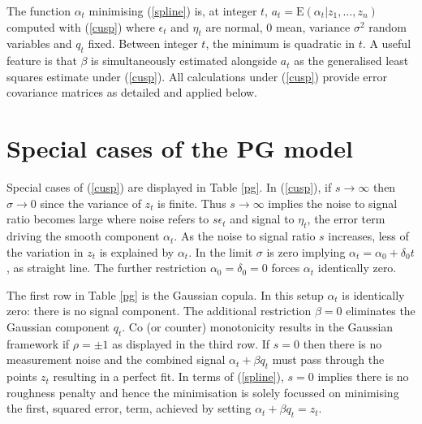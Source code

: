 \documentclass[authoryear]{elsarticle}
\newcommand{\E}{\mathrm{E}}
\newcommand{\eps}{\epsilon}
\newcommand{\eref}[1]{(\ref{#1})}
\newcommand{\tref}[1]{Table \ref{#1}}
\begin{document}
The  function $\alpha_t$ minimising \eref{spline}  is, at integer $t$,  $a_t=\E(\alpha_t|z_1,\ldots,z_n)$  computed with \eref{cusp} where $\eps_t$ and $\eta_t$ are normal, 0 mean, variance $\sigma^2$ random variables and $q_t$ fixed.  Between integer $t$,  the  minimum is quadratic in $t$.  A useful feature is that $\beta$ is simultaneously estimated alongside $a_t$ as the generalised least squares estimate under \eref{cusp}.  All calculations under \eref{cusp} provide error covariance matrices as detailed and applied below.  

\section{Special cases of the PG model}  

Special cases of  \eref{cusp}  are displayed in \tref{pg}.   In \eref{cusp}, if $s\rightarrow\infty$ then $\sigma\rightarrow 0$   since the variance of $z_t$ is finite.    Thus $s\rightarrow\infty$  implies the noise to signal ratio becomes large where noise refers to   $s\eps_t$ and signal to $\eta_t$, the error term driving  the smooth component $\alpha_t$.   As the noise to signal ratio $s$ increases, less of the variation in $z_t$ is explained by $\alpha_t$.  In the limit $\sigma$ is zero implying $\alpha_t=\alpha_0+\delta_0 t$, as straight line.   The further restriction $\alpha_0=\delta_0=0$ forces $\alpha_t$ identically zero.



The first row in \tref{pg} is the  Gaussian copula.  In this setup $\alpha_t$ is identically zero: there is no  signal component.  The additional restriction $\beta=0$ eliminates the Gaussian component $q_t$.  Co (or counter) monotonicity results in the Gaussian framework if $\rho=\pm 1$ as displayed in the third row.
If $s= 0$ then there is no measurement noise and the combined signal $\alpha_t+\beta q_t$ must pass through the points $z_t$ resulting in a perfect fit.   In terms of \eref{spline}, $s=0$ implies there is no roughness penalty and hence the minimisation is solely focussed on minimising the first, squared error, term, achieved  by setting $\alpha_t+\beta q_t=z_t$. 
 
\end{document}
